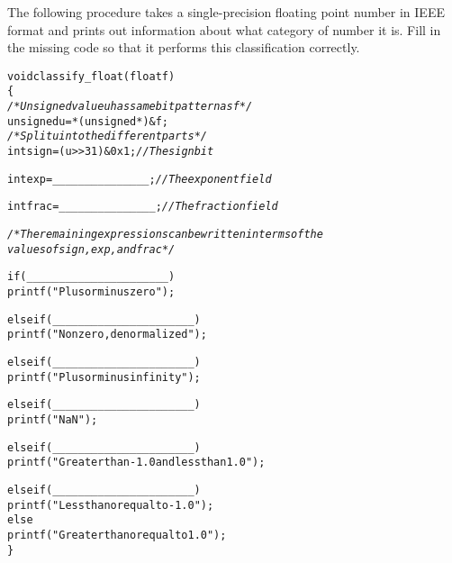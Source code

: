 \begin{problem}{8}

The following procedure takes a single-precision floating point number
in IEEE format and prints out information about what category of
number it is.  Fill in the missing code so that it performs this
classification correctly.

{\large
\begin{alltt}
void classify_float(float f)
\{
  {\it /* Unsigned value {\tt u} has same bit pattern as {\tt f} */}
  unsigned u = *(unsigned *) &f;
  {\it /* Split {\tt u} into the different parts */}
  int sign = (u >> 31) & 0x1;    {\it // The sign bit}

  int exp  = _______________;    {\it // The exponent field}

  int frac = _______________;    {\it // The fraction field}

  {\it /* The remaining expressions can be written in terms of the
     values of {\tt sign}, {\tt exp}, and {\tt frac} */}

  if (______________________)
    printf("Plus or minus zero\verb@\@");

  else if (______________________)
    printf("Nonzero, denormalized\verb@\@");

  else if (______________________)
    printf("Plus or minus infinity\verb@\@");

  else if (______________________)
    printf("NaN\verb@\@");

  else if (______________________)
    printf("Greater than -1.0 and less than 1.0\verb@\@");

  else if (______________________)
    printf("Less than or equal to -1.0\verb@\@");
  else
    printf("Greater than or equal to 1.0\verb@\@");
\}
\end{alltt}
}

\end{problem}